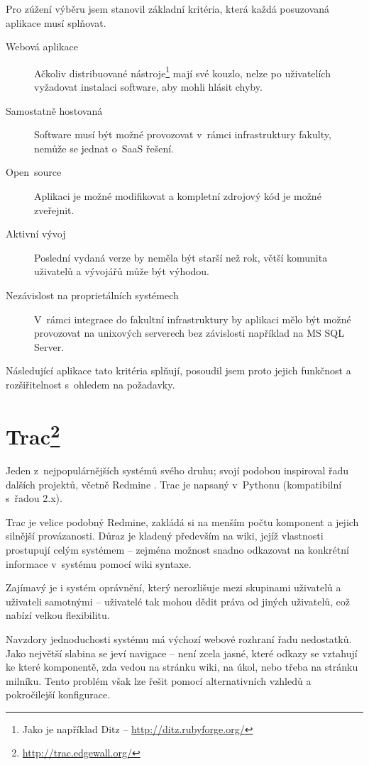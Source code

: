 \documentclass[thesis=B,czech]{FITthesis}[2012/05/02]
\begin{document}
Pro zúžení výběru jsem stanovil základní kritéria, která každá
posuzovaná aplikace musí splňovat.

\begin{description}
\item[Webová aplikace]
  Ačkoliv distribuované nástroje\footnote{Jako je například Ditz -- \url{http://ditz.rubyforge.org/}} mají své kouzlo,
  nelze po uživatelích vyžadovat instalaci software, aby mohli hlásit
  chyby.
\item[Samostatně hostovaná]
  Software musí být možné provozovat v~rámci
  infrastruktury fakulty, nemůže se jednat o~\gls{SaaS} řešení.
\item[Open~source]
  Aplikaci je možné modifikovat a kompletní zdrojový kód
  je možné zveřejnit.
\item[Aktivní vývoj]
  Poslední vydaná verze by neměla být starší než rok,
  větší komunita uživatelů a vývojářů může být výhodou.
\item[Nezávislost na proprietálních systémech]
  V~rámci integrace do
  fakultní infrastruktury by aplikaci mělo být možné provozovat na
  unixových serverech bez závislosti například na MS SQL Server.
\end{description}
Následující aplikace tato kritéria splňují, posoudil jsem proto jejich
funkčnost a rozšiřitelnost s~ohledem na požadavky.

\section[Trac]{Trac\footnote{\url{http://trac.edgewall.org/}}}

Jeden z~nejpopulárnějších systémů svého druhu; svojí podobou inspiroval
řadu dalších projektů, včetně Redmine \citep{TracRedMine}. Trac je
napsaný v~Pythonu (kompatibilní s~řadou 2.x).

Trac je velice podobný Redmine, zakládá si na menším počtu komponent a
jejich silnější provázanosti. Důraz je kladený především na wiki, jejíž
vlastnosti prostupují celým systémem -- zejména možnost snadno
odkazovat na konkrétní informace v~systému pomocí wiki syntaxe.

Zajímavý je i systém oprávnění, který nerozlišuje mezi skupinami
uživatelů a uživateli samotnými -- uživatelé tak mohou dědit práva od
jiných uživatelů, což nabízí velkou flexibilitu.

Navzdory jednoduchosti systému má výchozí webové rozhraní řadu
nedostatků. Jako největší slabina se jeví navigace -- není zcela jasné,
které odkazy se vztahují ke které komponentě, zda vedou na stránku wiki,
na úkol, nebo třeba na stránku milníku. Tento problém však lze řešit
pomocí alternativních vzhledů a pokročilejší konfigurace.
\end{document}
